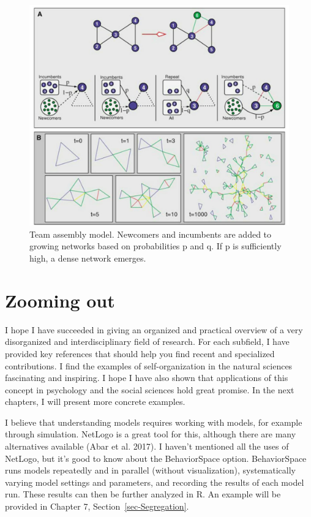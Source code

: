 \documentclass[
  a4paper,
  DIV=11,
  numbers=noendperiod,
  oneside]{scrreprt}
\begin{document}
\begin{figure}

{\centering \includegraphics{media/ch5n/image10.jpg}

}

\caption{\label{fig-ch5n-img10-old-48}Team assembly model. Newcomers and
incumbents are added to growing networks based on probabilities p and q.
If p is sufficiently high, a dense network emerges.}

\end{figure}

\hypertarget{sec-Zooming-out}{%
\section{Zooming out}\label{sec-Zooming-out}}

I hope I have succeeded in giving an organized and practical overview of
a very disorganized and interdisciplinary field of research. For each
subfield, I have provided key references that should help you find
recent and specialized contributions. I find the examples of
self-organization in the natural sciences fascinating and inspiring. I
hope I have also shown that applications of this concept in psychology
and the social sciences hold great promise. In the next chapters, I will
present more concrete examples.

I believe that understanding models requires working with models, for
example through simulation. NetLogo is a great tool for this, although
there are many alternatives available (Abar et al. 2017). I haven't
mentioned all the uses of NetLogo, but it's good to know about the
BehaviorSpace option. BehaviorSpace runs models repeatedly and in
parallel (without visualization), systematically varying model settings
and parameters, and recording the results of each model run. These
results can then be further analyzed in R. An example will be provided
in Chapter 7, Section~\ref{sec-Segregation}.
\end{document}
